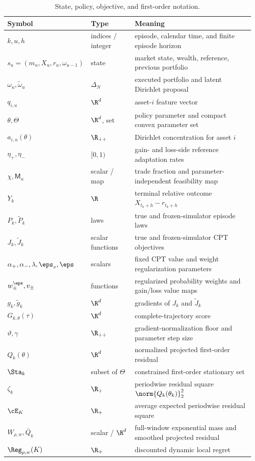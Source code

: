 \begin{table}[h]
\centering
\caption{State, policy, objective, and first-order notation.}
\label{tab:notation-core}
\small
\begin{tabularx}{\textwidth}{@{}p{}p{}X@{}}
\toprule
Symbol & Type & Meaning \\
\midrule
$k,u,h$ & indices / integer & episode, calendar time, and finite episode horizon \\
$s_u=(m_u,X_u,r_u,\omega_{u-1})$ & state & market state, wealth, reference, previous portfolio \\
$\omega_u,\widetilde\omega_u$ & $\Delta_N$ & executed portfolio and latent Dirichlet proposal \\
$q_{i,u}$ & $\R^d$ & asset-$i$ feature vector \\
$\theta,\Theta$ & $\R^d$, set & policy parameter and compact convex parameter set \\
$a_{i,u}(\theta)$ & $\R_{++}$ & Dirichlet concentration for asset $i$ \\
$\eta_+,\eta_-$ & $[0,1)$ & gain- and loss-side reference adaptation rates \\
$\chi,\mathsf M_u$ & scalar / map & trade fraction and parameter-independent feasibility map \\
$Y_k$ & $\R$ & terminal relative outcome $X_{t_k+h}-r_{t_k+h}$ \\
$P_k,\widetilde P_k$ & laws & true and frozen-simulator episode laws \\
$J_k,\widetilde J_k$ & scalar functions & true and frozen-simulator CPT objectives \\
$\alpha_+,\alpha_-,\lambda,\eps_v,\eps$ & scalars & fixed CPT value and weight regularization parameters \\
$w_\pm^\eps,v_\pm$ & functions & regularized probability weights and gain/loss value maps \\
$g_k,\widetilde g_k$ & $\R^d$ & gradients of $J_k$ and $\widetilde J_k$ \\
$G_{k,\theta}(\tau)$ & $\R^d$ & complete-trajectory score \\
$\vartheta,\gamma$ & $\R_{++}$ & gradient-normalization floor and parameter step size \\
$Q_k(\theta)$ & $\R^d$ & normalized projected first-order residual \\
$\Sta_k$ & subset of $\Theta$ & constrained first-order stationary set \\
$\zeta_k$ & $\R_+$ & periodwise residual square $\norm{Q_k(\theta_k)}_2^2$ \\
$\cE_K$ & $\R_+$ & average expected periodwise residual square \\
$W_{\rho,w},\bar Q_k$ & scalar / $\R^d$ & full-window exponential mass and smoothed projected residual \\
$\Reg_{\rho,w}(K)$ & $\R_+$ & discounted dynamic local regret \\
\bottomrule
\end{tabularx}
\end{table}

